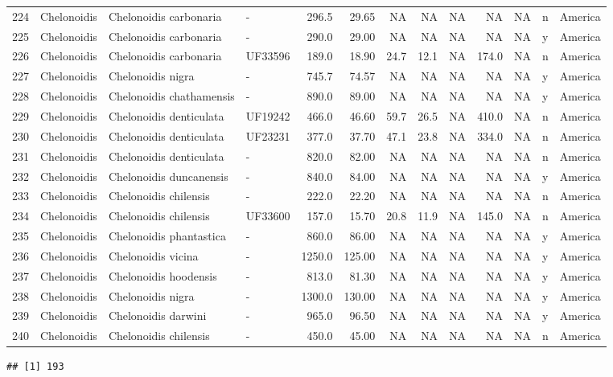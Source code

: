 \documentclass[]{article}
\newenvironment{Shaded}{\begin{snugshade}}{\end{snugshade}}
\newcommand{\KeywordTok}[1]{\textcolor[rgb]{0.13,0.29,0.53}{\textbf{{#1}}}}
\newcommand{\NormalTok}[1]{{#1}}
\begin{document}
\begin{longtable}[]{@{}llllrrrrrrlll@{}}
224 & Chelonoidis & Chelonoidis carbonaria & - & 296.5 & 29.65 & NA & NA
& NA & NA & NA & n & America\tabularnewline
225 & Chelonoidis & Chelonoidis carbonaria & - & 290.0 & 29.00 & NA & NA
& NA & NA & NA & y & America\tabularnewline
226 & Chelonoidis & Chelonoidis carbonaria & UF33596 & 189.0 & 18.90 &
24.7 & 12.1 & NA & 174.0 & NA & n & America\tabularnewline
227 & Chelonoidis & Chelonoidis nigra & - & 745.7 & 74.57 & NA & NA & NA
& NA & NA & y & America\tabularnewline
228 & Chelonoidis & Chelonoidis chathamensis & - & 890.0 & 89.00 & NA &
NA & NA & NA & NA & y & America\tabularnewline
229 & Chelonoidis & Chelonoidis denticulata & UF19242 & 466.0 & 46.60 &
59.7 & 26.5 & NA & 410.0 & NA & n & America\tabularnewline
230 & Chelonoidis & Chelonoidis denticulata & UF23231 & 377.0 & 37.70 &
47.1 & 23.8 & NA & 334.0 & NA & n & America\tabularnewline
231 & Chelonoidis & Chelonoidis denticulata & - & 820.0 & 82.00 & NA &
NA & NA & NA & NA & n & America\tabularnewline
232 & Chelonoidis & Chelonoidis duncanensis & - & 840.0 & 84.00 & NA &
NA & NA & NA & NA & y & America\tabularnewline
233 & Chelonoidis & Chelonoidis chilensis & - & 222.0 & 22.20 & NA & NA
& NA & NA & NA & n & America\tabularnewline
234 & Chelonoidis & Chelonoidis chilensis & UF33600 & 157.0 & 15.70 &
20.8 & 11.9 & NA & 145.0 & NA & n & America\tabularnewline
235 & Chelonoidis & Chelonoidis phantastica & - & 860.0 & 86.00 & NA &
NA & NA & NA & NA & y & America\tabularnewline
236 & Chelonoidis & Chelonoidis vicina & - & 1250.0 & 125.00 & NA & NA &
NA & NA & NA & y & America\tabularnewline
237 & Chelonoidis & Chelonoidis hoodensis & - & 813.0 & 81.30 & NA & NA
& NA & NA & NA & y & America\tabularnewline
238 & Chelonoidis & Chelonoidis nigra & - & 1300.0 & 130.00 & NA & NA &
NA & NA & NA & y & America\tabularnewline
239 & Chelonoidis & Chelonoidis darwini & - & 965.0 & 96.50 & NA & NA &
NA & NA & NA & y & America\tabularnewline
240 & Chelonoidis & Chelonoidis chilensis & - & 450.0 & 45.00 & NA & NA
& NA & NA & NA & n & America\tabularnewline
\bottomrule
\end{longtable}

\begin{Shaded}
\end{Shaded}

\begin{verbatim}
## [1] 193
\end{verbatim}
\end{document}
